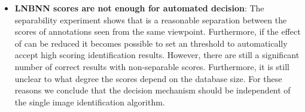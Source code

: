 \begin{itemize}
              \item \textbf{LNBNN scores are not enough for automated decision}:
                The separability experiment shows that is a reasonable
                  separation between the scores of annotations seen from
                  the same viewpoint.
                Furthermore, if the effect of \photobombings{} can be
                  reduced it becomes possible to set an threshold to
                  automatically accept high scoring identification
                  results.
                However, there are still a significant number of
                  correct results with non-separable scores.
                Furthermore, it is still unclear to what degree the
                  scores depend on the database size.
                For these reasons we conclude that the decision
                  mechanism should be independent of the single image
                  identification algorithm.
        \end{itemize}
